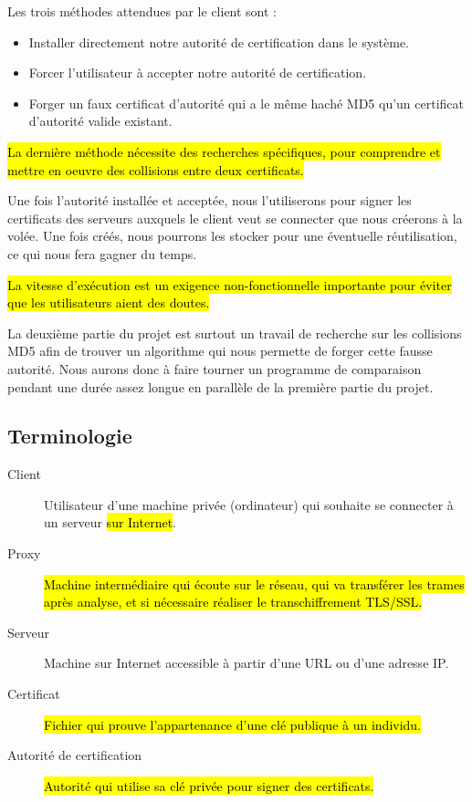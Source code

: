 \documentclass[a4paper,11pt,french]{article}
\begin{document}



Les trois méthodes attendues par le client sont :
\begin{itemize}
\item Installer directement notre autorité de certification dans le système.
\item Forcer l'utilisateur à accepter notre autorité de certification.
\item Forger un faux certificat d'autorité qui a le même haché MD5 qu'un certificat d'autorité valide existant.
\end{itemize}

\hl{La dernière méthode nécessite des recherches spécifiques, pour comprendre et mettre en oeuvre des collisions entre deux certificats.}


Une fois l'autorité installée et acceptée, nous l'utiliserons pour signer les certificats des serveurs auxquels le client veut se connecter que nous créerons à la volée. Une fois créés, nous pourrons les stocker pour une éventuelle réutilisation, ce qui nous fera gagner du temps.


\hl{La vitesse d'exécution est un exigence non-fonctionnelle importante pour éviter que les utilisateurs aient des doutes.}

La deuxième partie du projet est surtout un travail de recherche sur les collisions MD5 afin de trouver un algorithme qui nous permette de forger cette fausse autorité. Nous aurons donc à faire tourner un programme de comparaison pendant une durée assez longue en parallèle de la première partie du projet.

\subsection{Terminologie}

\begin{description}
\item[Client] Utilisateur d'une machine privée (ordinateur) qui souhaite se connecter à un serveur \hl{sur Internet}.
\item[Proxy] \hl{Machine intermédiaire qui écoute sur le réseau, qui va transférer les trames après analyse, et si nécessaire réaliser le transchiffrement TLS/SSL.}
\item[Serveur] Machine sur Internet accessible à partir d'une URL ou d'une adresse IP.
\item[Certificat] \hl{Fichier qui prouve l'appartenance d'une clé publique à un individu.}
\item[Autorité de certification] \hl{Autorité qui utilise sa clé privée pour signer des certificats.}

\end{description}
\end{document}
